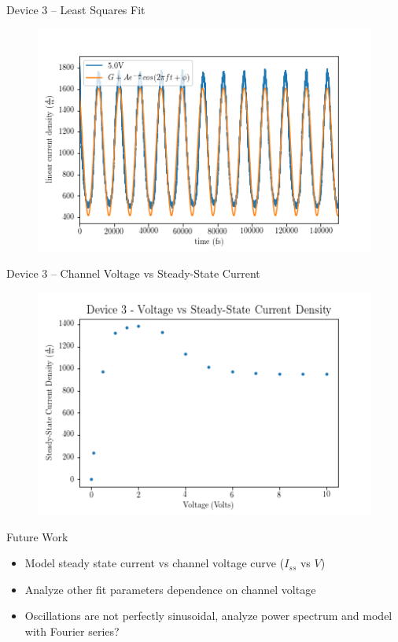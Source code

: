 \documentclass{beamer}
\begin{document}
\begin{frame}{Device 3 -- Least Squares Fit}
    \begin{figure}
        \centering
        \includegraphics[scale=0.5]{Figures/Device_3/Curve_fit/5_0V.png}
        \label{fig:dev_3_fit}
    \end{figure}
\end{frame}

\begin{frame}{Device 3 -- Channel Voltage vs Steady-State Current}
    \begin{figure}
        \centering
        \includegraphics[scale=0.5]{Figures/Device_3/SteadyState.png}
        \label{fig:dev_3_steady}
    \end{figure}
\end{frame}

\begin{frame}{Future Work}
    \begin{itemize}
        \item Model steady state current vs channel voltage curve ($I_{ss}$ vs $V$)
        \item Analyze other fit parameters dependence on channel voltage
        \item Oscillations are not perfectly sinusoidal, analyze power spectrum and model with Fourier series?
    \end{itemize}
\end{frame}
 
\end{document}
